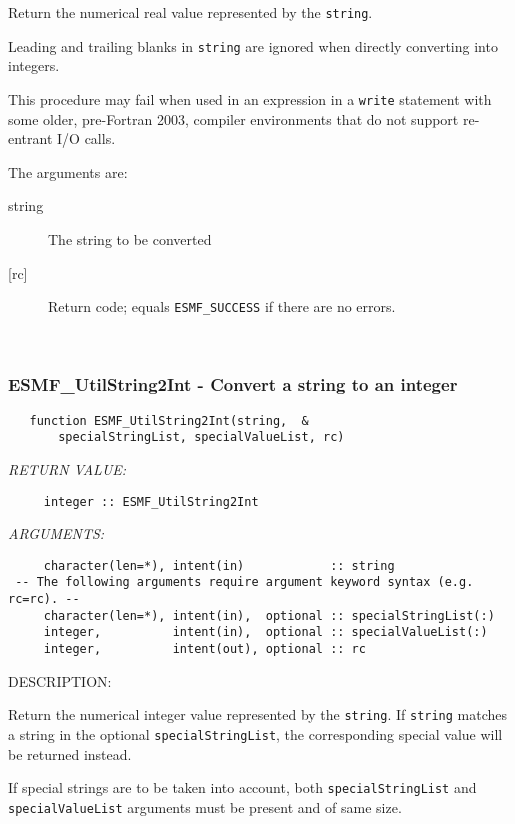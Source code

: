      Return the numerical real value represented by the {\tt string}.
  
     Leading and trailing blanks in {\tt string} are ignored when directly
     converting into integers.
  
     This procedure may fail when used in an expression in a {\tt write} statement
     with some older, pre-Fortran 2003, compiler environments that do not support
     re-entrant I/O calls.
  
     The arguments are:
     \begin{description}
     \item[string]
       The string to be converted
     \item[{[rc]}]
       Return code; equals {\tt ESMF\_SUCCESS} if there are no errors.
     \end{description}
   
 
\mbox{}\hrulefill\ 
 
\subsubsection [ESMF\_UtilString2Int] {ESMF\_UtilString2Int - Convert a string to an integer}


\begin{verbatim}   function ESMF_UtilString2Int(string,  &
       specialStringList, specialValueList, rc)\end{verbatim}{\em RETURN VALUE:}
\begin{verbatim}     integer :: ESMF_UtilString2Int\end{verbatim}{\em ARGUMENTS:}
\begin{verbatim}     character(len=*), intent(in)            :: string
 -- The following arguments require argument keyword syntax (e.g. rc=rc). --
     character(len=*), intent(in),  optional :: specialStringList(:)
     integer,          intent(in),  optional :: specialValueList(:)
     integer,          intent(out), optional :: rc\end{verbatim}
{\sf DESCRIPTION:\\ }


     Return the numerical integer value represented by the {\tt string}.
     If {\tt string} matches a string in the optional {\tt specialStringList}, the
     corresponding special value will be returned instead.
  
     If special strings are to be taken into account, both 
     {\tt specialStringList} and {\tt specialValueList} arguments must be
     present and of same size.
     
